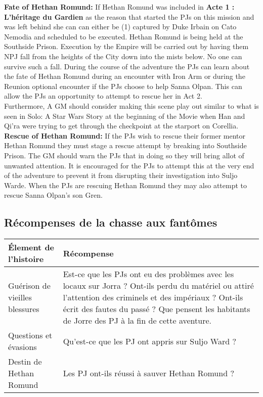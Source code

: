 \documentclass[twoside]{article}
\begin{document}
\textbf{Fate of Hethan Romund:} If Hethan Romund was included in \textbf{Acte 1 : L'héritage du Gardien} as the reason that started the PJs on this mission and was left behind she can can either be (1) captured by Duke Irbain on Cato Nemodia and scheduled to be executed.  Hethan Romund is being held at the Southside Prison.  Execution by the Empire will be carried out by having them NPJ fall from the heights of the City down into the mists below.  No one can survive such a fall. During the course of the adventure the PJs can learn about the fate of Hethan Romund during an encounter with Iron Arm or during the Reunion optional encounter if the PJs choose to help Sanna Olpan.  This can allow the PJs an opportunity to attempt to rescue her in Act 2. \\


Furthermore, A GM should consider making this scene play out similar to what is seen in Solo: A Star Wars Story at the beginning of the Movie when Han and Qi'ra were trying to get through the checkpoint at the starport on Corellia.\\


\textbf{Rescue of Hethan Romund:} If the PJs wish to rescue their former mentor Hethan Romund they must stage a rescue attempt by breaking into Southside Prison.  The GM should warn the PJs that in doing so they will bring allot of unwanted attention.  It is encouraged for the PJs to attempt this at the very end of the adventure to prevent it from disrupting their investigation into Suljo Warde.  When the PJs are rescuing Hethan Romund they may also attempt to rescue Sanna Olpan's son Gren.\\


\subsection{Récompenses de la chasse aux fantômes}
\renewcommand{\arraystretch}{1.4}
\begin{tabular}{|p{4.5cm}|p{12cm}|}
	\hline 
	\cellcolor{DarkRed} {\large \textcolor{PureWhite}{\textbf{Élement de l'histoire}}} & \cellcolor{DarkRed} {\large \textcolor{PureWhite}{\textbf{Récompense}}} \\ 
	\hline 
	Guérison de vieilles blessures & Est-ce que les PJs ont eu des problèmes avec les locaux sur Jorra ? Ont-ils perdu du matériel ou attiré l'attention des criminels et des impériaux ?  Ont-ils écrit des fautes du passé ? Que pensent les habitants de Jorre des PJ à la fin de cette aventure. \\ 
	\hline 
	Questions et évasions & Qu'est-ce que les PJ ont appris sur Suljo Ward ? \\ 
	\hline 
	Destin de Hethan Romund & Les PJ ont-ils réussi à sauver Hethan Romund ? \\ 
	\hline 
\end{tabular} 
\end{document}
